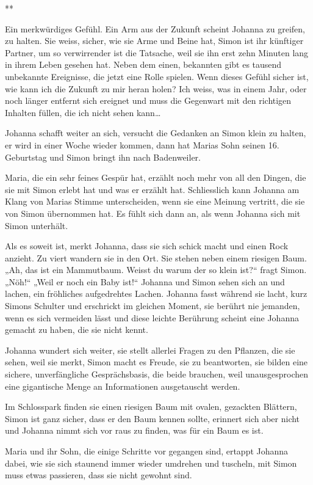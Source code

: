 \documentclass[10pt,titlepage,a5paper]{book}
\newcommand{\sterne}{\par{\centering ***\par}}
\begin{document}
\sterne

Ein merkwürdiges Gefühl. Ein Arm aus der Zukunft scheint Johanna zu greifen, zu halten. Sie weiss, sicher, wie sie Arme und Beine hat, Simon ist ihr künftiger Partner, um so verwirrender ist die Tatsache, weil sie ihn erst zehn Minuten lang in ihrem Leben gesehen hat. Neben dem einen, bekannten gibt es tausend unbekannte Ereignisse, die jetzt eine Rolle spielen. Wenn dieses Gefühl sicher ist, wie kann ich die Zukunft zu mir heran holen? Ich weiss, was in einem Jahr, oder noch länger entfernt sich ereignet und muss die Gegenwart mit den richtigen Inhalten füllen, die ich nicht sehen kann\dots 

Johanna schafft weiter an sich, versucht die Gedanken an Simon klein zu halten, er wird in einer Woche wieder kommen, dann hat Marias Sohn seinen 16. Geburtstag und Simon bringt ihn nach Badenweiler.

Maria, die ein sehr feines Gespür hat, erzählt noch mehr von all den Dingen, die sie mit Simon erlebt hat und was er erzählt hat. Schliesslich kann Johanna am Klang von Marias Stimme unterscheiden, wenn sie eine Meinung vertritt, die sie von Simon übernommen hat. Es fühlt sich dann an, als wenn Johanna sich mit Simon unterhält. 

 Als es soweit ist, merkt Johanna, dass sie sich schick macht und einen Rock anzieht. Zu viert wandern sie in den Ort. Sie stehen neben einem riesigen Baum. „Ah, das ist ein Mammutbaum. Weisst du warum der so klein ist?“ fragt Simon. „Nöh!“ „Weil er noch ein Baby ist!“ Johanna und Simon sehen sich an und lachen, ein fröhliches aufgedrehtes Lachen. Johanna fasst während sie lacht, kurz Simons Schulter und erschrickt im gleichen Moment, sie berührt nie jemanden, wenn es sich vermeiden lässt und diese leichte Berührung scheint eine Johanna gemacht zu haben, die sie nicht kennt.
 
Johanna wundert sich weiter, sie stellt allerlei Fragen zu den Pflanzen, die sie sehen, weil sie merkt, Simon macht es Freude, sie zu beantworten, sie bilden eine sichere, unverfängliche Gesprächsbasis, die beide brauchen, weil unausgesprochen eine gigantische Menge an Informationen ausgetauscht werden.

Im Schlosspark finden sie einen riesigen Baum mit ovalen, gezackten Blättern, Simon ist ganz sicher, dass er den Baum kennen sollte, erinnert sich aber nicht und Johanna nimmt sich vor raus zu finden, was für ein Baum es ist.

Maria und ihr Sohn, die einige Schritte vor gegangen sind, ertappt Johanna dabei, wie sie sich staunend immer wieder umdrehen und tuscheln, mit Simon muss etwas passieren, dass sie nicht gewohnt sind.
\end{document}
